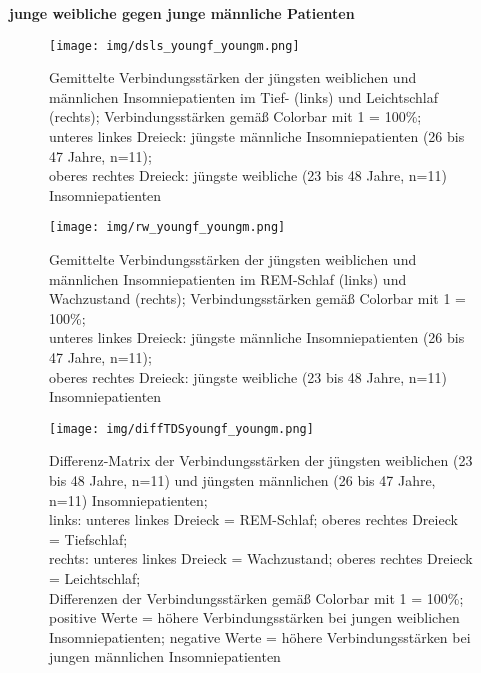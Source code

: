 \textbf{junge weibliche gegen junge männliche Patienten}



\begin{figure}[H]
	\centering
	\texttt{[image: img/dsls\_youngf\_youngm.png]}
	\caption[Verbindungsstärken der jüngsten weiblichen und männlichen Insomniepatienten im Tief- und Leichtschlaf]{Gemittelte Verbindungsstärken der jüngsten weiblichen und männlichen Insomniepatienten im Tief- (links) und Leichtschlaf (rechts); Verbindungsstärken gemäß Colorbar mit 1 = 100\%;\\unteres linkes Dreieck: jüngste männliche Insomniepatienten (26 bis 47 Jahre, n=11);\\oberes rechtes Dreieck: jüngste weibliche (23 bis 48 Jahre, n=11) Insomniepatienten}
	\label{fig:dsls_youngf_youngm}
\end{figure}

\begin{figure}[H]
	\centering
	\texttt{[image: img/rw\_youngf\_youngm.png]}
	\caption[Verbindungsstärken der jüngsten weiblichen und männlichen Insomniepatienten im REM-Schlaf und Wachzustand]{Gemittelte Verbindungsstärken der jüngsten weiblichen und männlichen Insomniepatienten im REM-Schlaf (links) und Wachzustand (rechts); Verbindungsstärken gemäß Colorbar mit 1 = 100\%;\\unteres linkes Dreieck: jüngste männliche Insomniepatienten (26 bis 47 Jahre, n=11);\\oberes rechtes Dreieck: jüngste weibliche (23 bis 48 Jahre, n=11) Insomniepatienten}
	\label{fig:rw_youngf_youngm}
\end{figure}

\begin{figure}[H]
	\centering
	\texttt{[image: img/diffTDSyoungf\_youngm.png]}
	\caption[Differenz-Matrix der Verbindungsstärken der jüngsten weiblichen und männlichen Insomniepatienten]{Differenz-Matrix der Verbindungsstärken der jüngsten weiblichen (23 bis 48 Jahre, n=11) und jüngsten männlichen (26 bis 47 Jahre, n=11) Insomniepatienten;\\links: unteres linkes Dreieck = REM-Schlaf; oberes rechtes Dreieck = Tiefschlaf;\\rechts: unteres linkes Dreieck = Wachzustand; oberes rechtes Dreieck = Leichtschlaf;\\Differenzen der Verbindungsstärken gemäß Colorbar mit 1 = 100\%;\\positive Werte = höhere Verbindungsstärken bei jungen weiblichen Insomniepatienten; negative Werte = höhere Verbindungsstärken bei jungen männlichen Insomniepatienten}
	\label{fig:diffTDSyoungf_youngm}
\end{figure}



